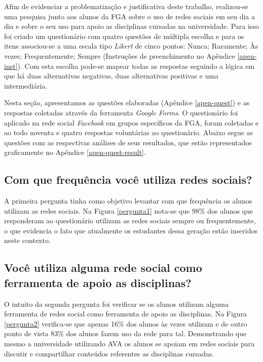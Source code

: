 Afim de evidenciar a problematização e justificativa deste trabalho, realizou-se uma pesquisa junto aos alunos da FGA sobre o uso de redes sociais em seu dia a dia e sobre o seu uso para apoio as disciplinas cursadas na universidade. Para isso foi criado um questionário com quatro questões de múltipla escolha e para os itens associou-se a uma escala tipo \emph{Likert} de cinco pontos: Nunca; Raramente; Às vezes; Frequentemente; Sempre (Instruções de preenchimento no Apêndice \ref{apen-inst}). Com esta escolha pode-se mapear todas as respostas seguindo a lógica em que há duas alternativas negativas, duas alternativas positivas e uma intermediária.

Nesta seção, apresentamos as questões elaboradas (Apêndice \ref{apen-quest}) e as respostas coletadas através da ferramenta \textit{Google Forms}. O questionário foi aplicado na rede social \textit{Facebook} em grupos específicos da FGA, foram coletadas e ao todo noventa e quatro respostas voluntárias ao questionário. Abaixo segue as questões com as respectivas análises de seus resultados, que estão representados graficamente no Apêndice \ref{apen-quest-result}.

\subsection*{Com que frequência você utiliza redes sociais?}

A primeira pergunta tinha como objetivo levantar com que frequência os alunos utilizam as redes sociais. Na Figura \ref{pergunta1} nota-se que 98\% dos alunos que responderam ao questionário utilizam as redes sociais sempre ou frequentemente, o que evidencia o fato que atualmente os estudantes dessa geração estão inseridos neste contexto.

\subsection*{Você utiliza alguma rede social como ferramenta de apoio as disciplinas?}

O intuito da segunda pergunta foi verificar se os alunos utilizam alguma ferramenta de redes social como ferramenta de apoio as disciplinas. Na Figura \ref{pergunta2} verifica-se que apenas 16\% dos alunos às vezes utilizam e de outro ponto de vista 83\% dos alunos fazem uso da rede para tal. Demonstrando que mesmo a universidade utilizando AVA os alunos se apoiam em redes sociais para discutir e compartilhar conteúdos referentes as disciplinas cursadas.

